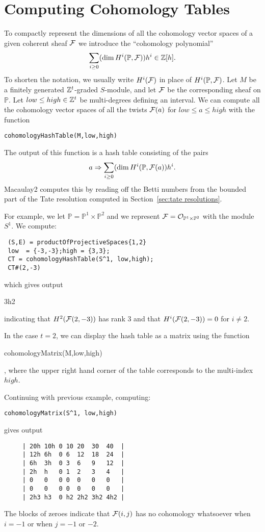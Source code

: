 \documentclass[twoside,12pt, leqno]{amsart}
\def\PP{{\mathbb P}}
\begin{document}
\section{Computing Cohomology Tables}\label{sec:cohom tables}
To compactly represent the dimensions of all the cohomology vector spaces of a given coherent sheaf ${\mathcal F}$ we introduce the ``cohomology polynomial''
$$
\sum_{i\geq 0} (\dim H^i(\PP, \sF))h^i\in \ZZ[h].
$$
To shorten the notation, we usually write $H^i({\mathcal F})$ in place of $H^i(\PP, \sF)$.
Let $M$ be a finitely generated ${\mathbb Z}^t$-graded $S$-module, and let ${\mathcal F}$ be the 
corresponding sheaf on $\PP$. Let
$low\leq high\in {\mathbb Z}^t$ be multi-degrees defining an interval. We can compute
all the cohomology vector spaces of all the twists ${\mathcal F}(a)$ for $low\leq a\leq high$ with the function 
\begin{verbatim}
cohomologyHashTable(M,low,high)
\end{verbatim}
The output of this function is a hash table consisting of the pairs
$$ 
a \Rightarrow \sum_{i\geq 0} (\dim H^i(\PP, \sF(a))h^i.
$$
Macaulay2 computes this by reading off the Betti numbers from the bounded part of the Tate resolution computed in Section~\ref{sec:tate resolutions}.

For example, we let $\PP=\PP^1\times \PP^2$ and we represent $\sF = \sO_{\PP^1\times \PP^2}$ with the module
$S^1$.  We compute:
\begin{verbatim}
 (S,E) = productOfProjectiveSpaces{1,2}
 low  = {-3,-3};high = {3,3};
 CT = cohomologyHashTable(S^1, low,high);
 CT#(2,-3)
\end{verbatim}
which gives output
\begin{verb}
3h2
\end{verb}
indicating that $H^2({\mathcal F}(2,-3))$ has rank $3$ and that $H^i({\mathcal F}(2,-3)) = 0$ for $i\ne 2$.

In the case $t=2$, we can display the hash table as a matrix using the function
\begin{verb}
 cohomologyMatrix(M,low,high)
\end{verb},
where the upper right hand corner of the table corresponds to the multi-index $high$.

Continuing with previous example, computing:
\begin{verbatim}
cohomologyMatrix(S^1, low,high)
\end{verbatim}
gives output
\begin{verbatim}
     | 20h 10h 0 10 20  30  40  |
     | 12h 6h  0 6  12  18  24  |
     | 6h  3h  0 3  6   9   12  |
     | 2h  h   0 1  2   3   4   |
     | 0   0   0 0  0   0   0   |
     | 0   0   0 0  0   0   0   |
     | 2h3 h3  0 h2 2h2 3h2 4h2 |
\end{verbatim}
The blocks of zeroes indicate that ${\mathcal F}(i,j)$ has no cohomology whatsoever when $i=-1$ or when $j=-1$ or $-2$.
\end{document}
